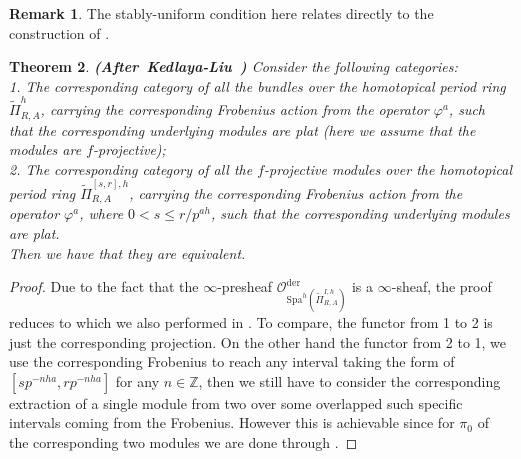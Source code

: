 \documentclass[12pt]{amsart}
\newtheorem{theorem}{Theorem}[section]
\theoremstyle{definition}
\newtheorem{remark}[theorem]{Remark}
\numberwithin{equation}{section}
\begin{document}
\begin{remark}
The stably-uniform condition here relates directly to the construction of \cite{BK}. 	
\end{remark}



\begin{theorem} \mbox{\bf{(After Kedlaya-Liu \cite[Theorem 4.6.1]{KL2})}} \label{theorem4.12}
Consider the following categories:\\
1. The corresponding category of all the bundles over the homotopical period ring $\widetilde{\Pi}^h_{R,A}$, carrying the corresponding Frobenius action from the operator $\varphi^a$, such that the corresponding underlying modules are plat (here we assume that the modules are $f$-projective);\\
2. The corresponding category of all the $f$-projective modules over the homotopical period ring $\widetilde{\Pi}^{[s,r],h}_{R,A}$, carrying the corresponding Frobenius action from the operator $\varphi^a$, where $0<s\leq r/p^{ah}$, such that the corresponding underlying modules are plat.\\
Then we have that they are equivalent.
\end{theorem}






\begin{proof}
Due to the fact that the $\infty$-presheaf $\mathcal{O}^\mathrm{der}_{\mathrm{Spa}^h(\widetilde{\Pi}^{I,h}_{R,A})}$ is a $\infty$-sheaf, the proof reduces to \cite[Theorem 4.6.1]{KL2} which we also performed in \cite[Section 4.2]{T2}. To compare, the functor from 1 to 2 is just the corresponding projection. On the other hand the functor from 2 to 1, we use the corresponding Frobenius to reach any interval taking the form of $[sp^{-nha},rp^{-nha}]$ for any $n\in \mathbb{Z}$, then we still have to consider the corresponding extraction of a single module from two over some overlapped such specific intervals coming from the Frobenius. However this is achievable since for $\pi_0$ of the corresponding two modules we are done through \cite[Theorem 1.3.9]{KL1}.
\end{proof}
\end{document}
